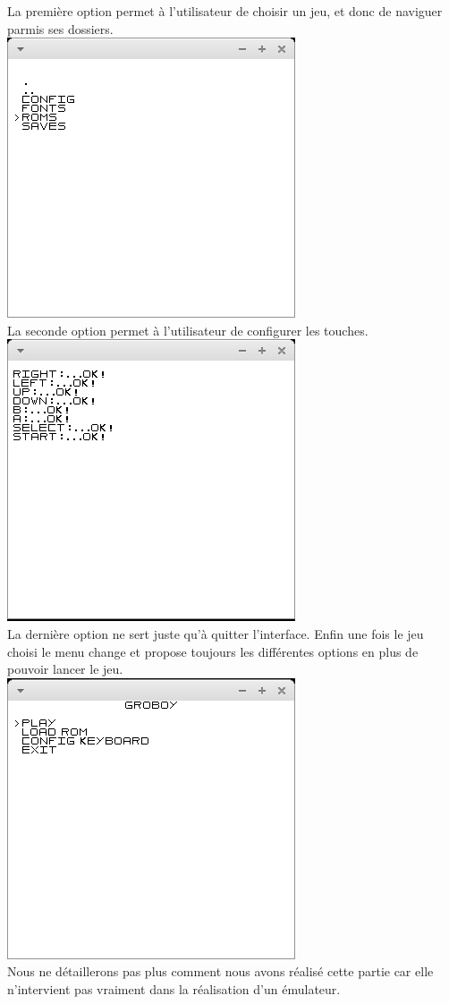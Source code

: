 \documentclass{report}
\begin{document}
La première option permet à l'utilisateur de choisir un jeu, et donc de naviguer parmis ses dossiers.\\
\includegraphics[scale=0.5]{images/screenshot_navigate.png}\\
La seconde option permet à l'utilisateur de configurer les touches.\\
\includegraphics[scale=0.5]{images/screenshot_config.png}\\
La dernière option ne sert juste qu'à quitter l'interface. Enfin une fois le jeu choisi le menu change et propose toujours les différentes options en plus de pouvoir lancer le jeu.\\
\includegraphics[scale=0.5]{images/screenshot_menu2.png}\\
Nous ne détaillerons pas plus comment nous avons réalisé cette partie car elle n'intervient pas vraiment dans la réalisation d'un émulateur.
\end{document}
